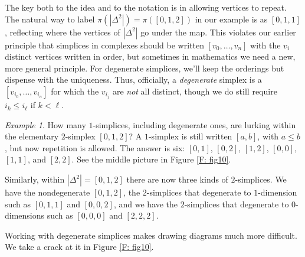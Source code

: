 \documentclass[12pt]{article}
\theoremstyle{plain}
\theoremstyle{definition}
\theoremstyle{remark}
\newtheorem{example}[theorem]{Example}
\begin{document}
The key both to the idea and to the notation is in allowing vertices to repeat. The natural way to label $\pi(|\Delta^2|)=\pi([0,1,2])$ in our example is as $[0,1,1]$, reflecting where the vertices of $|\Delta^2|$ go under the map. This violates our earlier principle that simplices in complexes should be written $[v_0,\ldots,v_n]$ with the $v_i$  distinct  vertices written in order, but sometimes in mathematics we need a new, more general principle. For degenerate simplices, we'll keep the orderings but dispense with the uniqueness. Thus, officially, a \emph{degenerate} simplex is a $[v_{i_0},\ldots, v_{i_n}]$ for which  the $v_{i_j}$ are \emph{not} all distinct, though we do still require  $i_k\leq i_\ell$ if $k<\ell$.



\begin{example}
How many  $1$-simplices, including degenerate ones, are lurking within the elementary $2$-simplex $[0,1,2]$? A $1$-simplex is still written $[a,b]$, with $a\leq b$, but now repetition is allowed. The answer is six: $[0,1]$, $[0,2]$, $[1,2]$, $[0,0]$, $[1,1]$, and $[2,2]$. See the middle picture in Figure \ref{F: fig10}.

Similarly, within $|\Delta^2|=[0,1,2]$ there are now three kinds of $2$-simplices. We have the nondegenerate $[0,1,2]$, the $2$-simplices that degenerate to $1$-dimension such as $[0,1,1]$ and $[0,0,2]$, and we have the $2$-simplices that degenerate to $0$-dimensions such as $[0,0,0]$ and $[2,2,2]$. 
\end{example}

Working with degenerate simplices makes drawing diagrams much more difficult. We take  a crack at it in Figure \ref{F: fig10}. 
\end{document}

